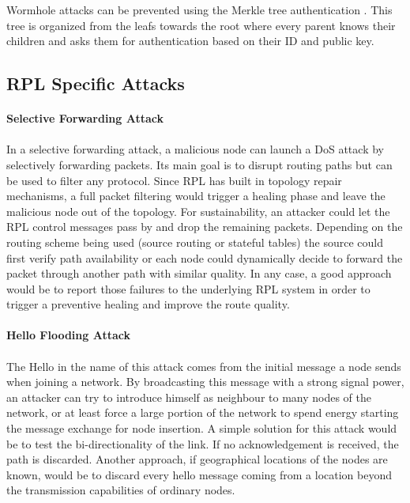 Wormhole attacks can be prevented using the Merkle tree authentication \cite{Khan2013}. This tree is organized from the leafs towards the root where every parent knows their children and asks them for authentication based on their ID and public key.
\pagebreak

\subsection{RPL Specific Attacks}
\paragraph{} 


\paragraph{\textbf{Selective Forwarding Attack}}
\paragraph{}
In a selective forwarding attack, a malicious node can launch a \gls{DoS} attack by selectively forwarding packets. Its main goal is to disrupt routing paths but can be used to filter any protocol. Since \gls{RPL} has built in topology repair mechanisms, a full packet filtering would trigger a healing phase and leave the malicious node out of the topology. For sustainability, an attacker could let the RPL control messages pass by and drop the remaining packets. Depending on the routing scheme being used (source routing or stateful tables) the source could first verify path availability or each node could dynamically decide to forward the packet through another path with similar quality. In any case, a good approach would be to report those failures to the underlying RPL system in order to trigger a preventive healing and improve the route quality.

\paragraph{\textbf{Hello Flooding Attack}}
\paragraph{}
The Hello in the name of this attack comes from the initial message a node sends when joining a network. By broadcasting this message with a strong signal power, an attacker can try to introduce himself as neighbour to many nodes of the network, or at least force a large portion of the network to spend energy starting the message exchange for node insertion. A simple solution for this attack would be to test the bi-directionality of the link. If no acknowledgement is received, the path is discarded. Another approach, if geographical locations of the nodes are known, would be to discard every hello message coming from a location beyond the transmission capabilities of ordinary nodes.

